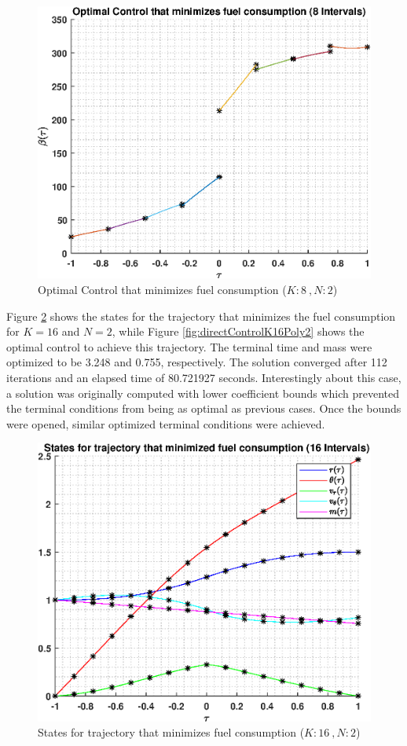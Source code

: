 \documentclass[]{article}
\begin{document}
\begin{figure}
	\centering
	\includegraphics[scale=0.75]{directControlK8Poly2.eps}
	\caption{Optimal Control that minimizes fuel consumption (\(K:8\ , N:2\))}
	\label{fig:directControlK8Poly2}
\end{figure}
Figure \ref{fig:directStatesK16Poly2} shows the states for the trajectory that minimizes the fuel consumption for \(K = 16\) and  \(N = 2\), while Figure \ref{fig:directControlK16Poly2} shows the optimal control to achieve this trajectory. The terminal time and mass were optimized to be 3.248 and 0.755, respectively. The solution converged after 112 iterations and an elapsed time of 80.721927 seconds. Interestingly about this case, a solution was originally computed with lower coefficient bounds which prevented the terminal conditions from being as optimal as previous cases. Once the bounds were opened, similar optimized terminal conditions were achieved.
\begin{figure}
	\centering
	\includegraphics[scale=0.75]{directStatesK16Poly2.eps}
	\caption{States for trajectory that minimizes fuel consumption (\(K:16\ , N:2\))}
	\label{fig:directStatesK16Poly2}
\end{figure}
\end{document}
